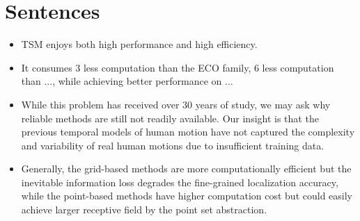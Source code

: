 \section{Sentences}

\begin{itemize}
  \item TSM enjoys both high performance and high efficiency.
  \item It consumes 3  less computation than the ECO family, 6  less computation than ..., while achieving better performance on ...
  \item While this problem has received over 30 years of study, we may ask why reliable methods are still not readily available. Our insight is that the previous temporal models of human motion have not captured the complexity and variability of real human motions due to insufficient training data.
\end{itemize}

\begin{itemize}
\item Generally, the grid-based methods are more computationally efficient but the inevitable information loss degrades the fine-grained localization accuracy, while the point-based methods have higher computation cost but could easily achieve larger receptive field by the point set abstraction. \cite{PCloud-CVPR2020-PVRCNN}
\end{itemize}